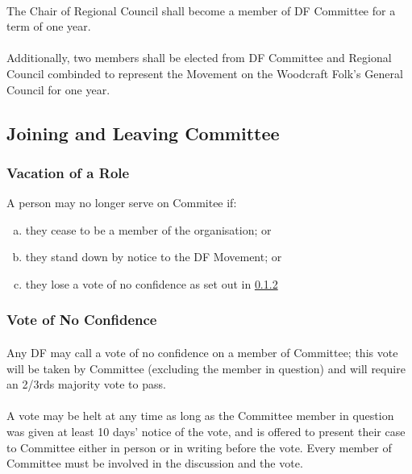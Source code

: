 \documentclass[a4paper, 12pt]{report}
\begin{document}
\paragraph{} The Chair of Regional Council shall become a member of DF Committee for a term of one year.

\paragraph{} Additionally, two members shall be elected from DF Committee and Regional Council combinded to represent the Movement on the Woodcraft Folk's General Council for one year.

\subsection{Joining and Leaving Committee}
\subsubsection{Vacation of a Role}
A person may no longer serve on Commitee if:
\begin{enumerate}[(a)]
\item they cease to be a member of the organisation; or
\item they stand down by notice to the DF Movement; or
\item they lose a vote of no confidence as set out in \ref{sec:noconfidence}
\end{enumerate}
\subsubsection{Vote of No Confidence}
\label{sec:noconfidence}
\paragraph{} Any DF may call a vote of no confidence on a member of Committee; this vote will be taken by Committee (excluding the member in question) and will require an 2/3rds majority vote to pass.
\paragraph{} A vote may be helt at any time as long as the Committee member in question was given at least 10 days' notice of the vote, and is offered to present their case to Committee either in person or in writing before the vote. Every member of Committee must be involved in the discussion and the vote.
\end{document}
